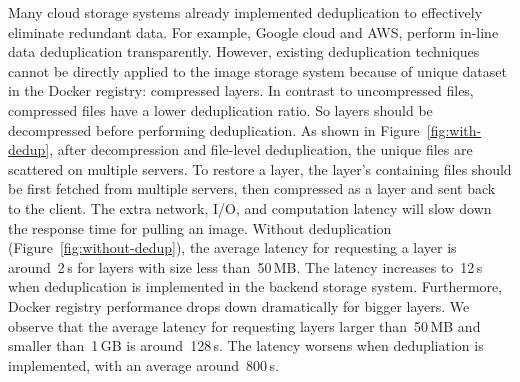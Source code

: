 Many cloud storage systems already implemented deduplication to effectively eliminate redundant data.
For example,
Google cloud and AWS, 
perform in-line data deduplication transparently.
However, existing deduplication techniques cannot be directly applied to the image storage system 
because of unique dataset in the Docker registry: compressed layers. 
In contrast to uncompressed files, compressed files have a lower deduplication ratio. 
So layers should be decompressed before performing deduplication.
As shown in Figure~\ref{fig:with-dedup}, 
after decompression and file-level deduplication, the unique files are scattered on
multiple servers. 
To restore a layer,
the layer's containing files should be first fetched from multiple servers, then compressed as a layer
and sent back to the client.
The extra network, I/O, and computation latency will slow down the response time for pulling an image.
Without deduplication (Figure~\ref{fig:without-dedup}),
the average latency for requesting a layer is around~2\,s for layers with size less than~50\,MB.
The latency increases to~12\,s when deduplication is implemented in the backend storage system.
Furthermore, Docker registry performance drops down dramatically for bigger layers.
We observe that the average latency for requesting layers larger than~50\,MB and smaller than~1\,GB
is around~128\,s. The latency worsens when dedupliation is implemented, with an average around~800\,s.
 

